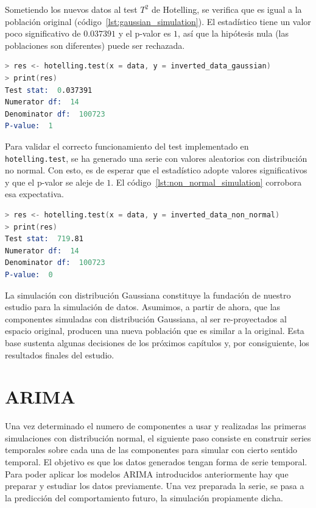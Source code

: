 \documentclass[11pt,spanish,listoffigures,listoftables]{tfgetsinf}
\begin{document}
    Sometiendo los nuevos datos al test \(T^2\) de Hotelling, se verifica que es igual a la población original (código~\ref{lst:gaussian_simulation}). El estadístico tiene un valor poco significativo de \(0.037391\) y el p-valor es \(1\), así que la hipótesis nula (las poblaciones son diferentes) puede ser rechazada.
    
    \begin{lstlisting}[language=S, caption=Test \(T^2\) de Hotelling para la simulación con distribución Gaussiana., label={lst:gaussian_simulation}]
> res <- hotelling.test(x = data, y = inverted_data_gaussian)
> print(res)
Test stat:  0.037391 
Numerator df:  14 
Denominator df:  100723 
P-value:  1 
    \end{lstlisting}
    
    Para validar el correcto funcionamiento del test implementado en {\tt hotelling.test}, se ha generado una serie con valores aleatorios con distribución no normal. Con esto, es de esperar que el estadístico adopte valores significativos y que el p-valor se aleje de \(1\). El código~\ref{lst:non_normal_simulation} corrobora esa expectativa.
   
    \begin{lstlisting}[language=S, caption=Test \(T^2\) de Hotelling para la simulación con distribución no normal., label={lst:non_normal_simulation}]
> res <- hotelling.test(x = data, y = inverted_data_non_normal)
> print(res)
Test stat:  719.81 
Numerator df:  14 
Denominator df:  100723 
P-value:  0 
    \end{lstlisting}

    La simulación con distribución Gaussiana constituye la fundación de nuestro estudio para la simulación de datos. Asumimos, a partir de ahora, que las componentes simuladas con distribución Gaussiana, al ser re-proyectados al espacio original, producen una nueva población que es similar a la original. Esta base sustenta algunas decisiones de los próximos capítulos y, por consiguiente, los resultados finales del estudio.
    
    
    \section{ARIMA}
    Una vez determinado el numero de componentes a usar y realizadas las primeras simulaciones con distribución normal, el siguiente paso consiste en construir series temporales sobre cada una de las componentes para simular con cierto sentido temporal. El objetivo es que los datos generados tengan forma de serie temporal. Para poder aplicar los modelos ARIMA introducidos anteriormente hay que preparar y estudiar los datos previamente. Una vez preparada la serie, se pasa a la predicción del comportamiento futuro, la simulación propiamente dicha.
        
\end{document}
